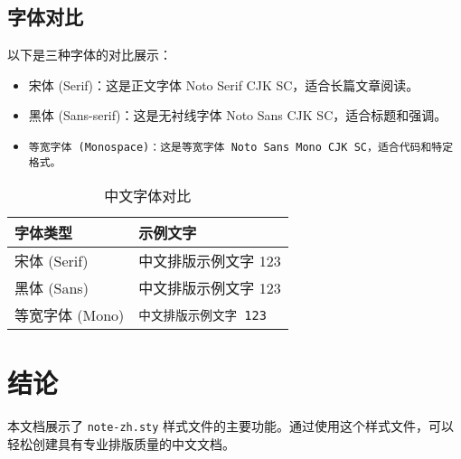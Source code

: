 \documentclass{article}
\begin{document}
\subsection{字体对比}
以下是三种字体的对比展示：

\begin{itemize}
  \item \textrm{宋体 (Serif)：这是正文字体 Noto Serif CJK SC，适合长篇文章阅读。}
  \item \textsf{黑体 (Sans-serif)：这是无衬线字体 Noto Sans CJK SC，适合标题和强调。}
  \item \texttt{等宽字体 (Monospace)：这是等宽字体 Noto Sans Mono CJK SC，适合代码和特定格式。}
\end{itemize}

\begin{table}[htbp]
  \centering
  \caption{中文字体对比}
  \begin{tabular}{ll}
    \toprule
    字体类型 & 示例文字 \\
    \midrule
    宋体 (Serif) & \textrm{中文排版示例文字 123} \\
    黑体 (Sans) & \textsf{中文排版示例文字 123} \\
    等宽字体 (Mono) & \texttt{中文排版示例文字 123} \\
    \bottomrule
  \end{tabular}
\end{table}

\section{结论}
本文档展示了 \texttt{note-zh.sty} 样式文件的主要功能。通过使用这个样式文件，可以轻松创建具有专业排版质量的中文文档。



\end{document}
